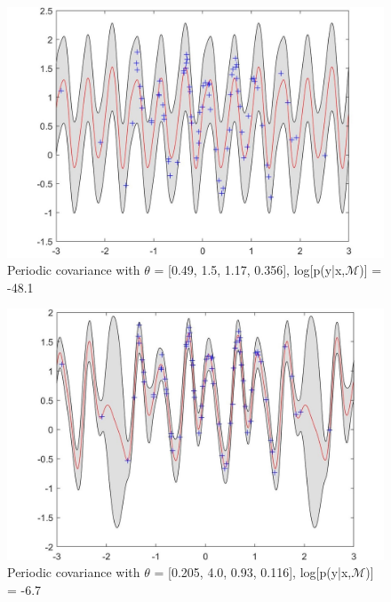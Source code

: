 \documentclass[twoside,twocolumn]{article}
\begin{document}
\begin{figure}[h]
  \centering
    \includegraphics[width=\linewidth]{c_1_3_1}
  \caption{Periodic covariance with \textbf{$\theta$} = [0.49, 1.5, 1.17, 0.356], log[p(y|x,$\mathcal{M}$)] = -48.1}
  \label{fig:per1}
\end{figure}

\begin{figure}[h]
  \centering
    \includegraphics[width=\linewidth]{c_1_3_2}
  \caption{Periodic covariance with \textbf{$\theta$} = [0.205, 4.0, 0.93, 0.116], log[p(y|x,$\mathcal{M}$)] = -6.7}
  \label{fig:per2}
\end{figure}
\end{document}
